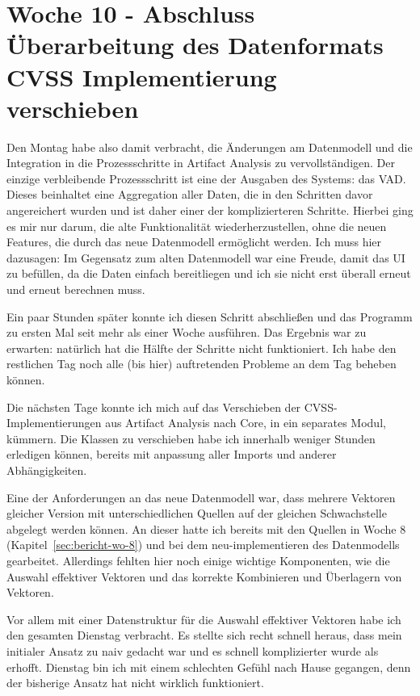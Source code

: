 \section{Woche 10 - Abschluss Überarbeitung des Datenformats \headerand CVSS Implementierung verschieben} \label{sec:bericht-wo-10}



Den Montag habe also damit verbracht, die Änderungen am Datenmodell und die Integration in die Prozessschritte in Artifact Analysis zu vervollständigen.
Der einzige verbleibende Prozessschritt ist eine der Ausgaben des Systems: das VAD\@.
Dieses beinhaltet eine Aggregation aller Daten, die in den Schritten davor angereichert wurden und ist daher einer der komplizierteren Schritte.
Hierbei ging es mir nur darum, die alte Funktionalität wiederherzustellen, ohne die neuen Features, die durch das neue Datenmodell ermöglicht werden.
Ich muss hier dazusagen: Im Gegensatz zum alten Datenmodell war eine Freude, damit das UI zu befüllen, da die Daten einfach bereitliegen und ich sie nicht erst überall erneut und erneut berechnen muss.

Ein paar Stunden später konnte ich diesen Schritt abschließen und das Programm zu ersten Mal seit mehr als einer Woche ausführen.
Das Ergebnis war zu erwarten: natürlich hat die Hälfte der Schritte nicht funktioniert.
Ich habe den restlichen Tag noch alle (bis hier) auftretenden Probleme an dem Tag beheben können.


Die nächsten Tage konnte ich mich auf das Verschieben der CVSS-Implementierungen aus Artifact Analysis nach Core, in ein separates Modul, kümmern.
Die Klassen zu verschieben habe ich innerhalb weniger Stunden erledigen können, bereits mit anpassung aller Imports und anderer Abhängigkeiten.

Eine der Anforderungen an das neue Datenmodell war, dass mehrere Vektoren gleicher Version mit unterschiedlichen Quellen auf der gleichen Schwachstelle abgelegt werden können.
An dieser hatte ich bereits mit den Quellen in Woche 8 (Kapitel\ \ref{sec:bericht-wo-8}) und bei dem neu-implementieren des Datenmodells gearbeitet.
Allerdings fehlten hier noch einige wichtige Komponenten, wie die Auswahl effektiver Vektoren und das korrekte Kombinieren und Überlagern von Vektoren.

Vor allem mit einer Datenstruktur für die Auswahl effektiver Vektoren habe ich den gesamten Dienstag verbracht.
Es stellte sich recht schnell heraus, dass mein initialer Ansatz zu naiv gedacht war und es schnell komplizierter wurde als erhofft.
Dienstag bin ich mit einem schlechten Gefühl nach Hause gegangen, denn der bisherige Ansatz hat nicht wirklich funktioniert.

